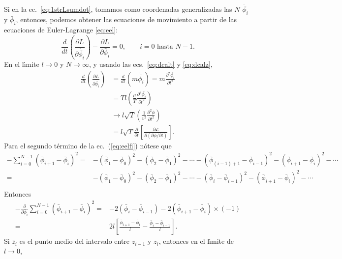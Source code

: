 Si en la ec.~\eqref{eq:1strLsumdot}, tomamos como coordenadas
generalizadas las $N$ $\dot{\bar{\phi_i}}$ y $\bar\phi_i$, entonces, podemos
obtener las ecuaciones de movimiento a partir de las ecuaciones de
Euler-Lagrange \eqref{eq:eel}:
\begin{equation}
  \label{eq:eelfi}
   \frac{d}{dt} \left ( \frac{\partial L}{\partial\dot{\bar{\phi_i}}} \right ) -
   \frac{\partial L}{\partial \bar\phi_i} = 0,
\qquad \text{$i=0$ hasta $N-1$}.
\end{equation}
En el l\'\i mite $l\to0$ y $N\to\infty$, y usando las ecs.~\eqref{eq:dcalt} 
y \eqref{eq:dcalz}, %
\begin{align}
  \label{eq:emov1}
  \frac{d}{dt} \left( \frac{\partial L}{\partial\dot{\bar{\phi_i}}} \right)
  &=\frac{d}{dt} \left( m\dot{\bar{\phi_i}} \right)
= m\frac{\partial^2\bar{\phi_i}}{\partial t^2} \nonumber\\
&= T l\left(\frac{\mu}{T}\frac{\partial^2\bar{\phi_i}}{\partial t^2} \right)\nonumber\\
  &\to
  l\sqrt{T}
  \left(
    \frac{1}{v^2}\frac{\partial^2\phi}{\partial t^2}
  \right)\\
  \label{eq:eecalt} %
  &=l\sqrt{T}\frac{\partial}{\partial t}
  \left[
    \frac{\partial\mathcal{L}}{\partial
      (\partial\phi/\partial t)}
  \right].
\end{align}
Para el segundo t\'ermino de la ec.~(\ref{eq:eelfi}) n\'otese que
\begin{align}
- \sum_{i=0}^{N-1}\left(\bar\phi_{i+1}-\bar\phi_{i}\right)^2= 
 &-\left(\bar\phi_{1}-\bar\phi_{0}\right)^2-\left(\bar\phi_{2}-\bar\phi_{1}\right)^2-\cdots
-\left(\bar\phi_{(i-1)+1}-\bar\phi_{i-1}\right)^2-\left(\bar\phi_{i+1}-\bar\phi_{i}\right)^2-\cdots\nonumber\\
 =&-\left(\bar\phi_{1}-\bar\phi_{0}\right)^2-\left(\bar\phi_{2}-\bar\phi_{1}\right)^2-\cdots
 -\left(\bar\phi_{i}-\bar\phi_{i-1}\right)^2-\left(\bar\phi_{i+1}-\bar\phi_{i}\right)^2-\cdots\nonumber\\
\end{align}
Entonces
\begin{align}
-\frac{\partial}{\partial\bar\phi_i}  \sum_{i=0}^{N-1}\left(\bar\phi_{i+1}-\bar\phi_{i}\right)^2
=&-2\left(\bar\phi_{i}-\bar\phi_{i-1}\right)-2\left(\bar\phi_{i+1}-\bar\phi_{i}\right)\times(-1)\nonumber\\
=&2l\left[\frac{\bar\phi_{i+1}-\bar\phi_{i}}{l}-\frac{\bar\phi_{i}-\bar\phi_{i-1}}{l}\right].\nonumber
\end{align}
Si $\bar{z}_i$ es el punto medio del intervalo entre $z_{i-1}$ y $z_i$, entonces en el l\'\i mite de $l\to0$,
